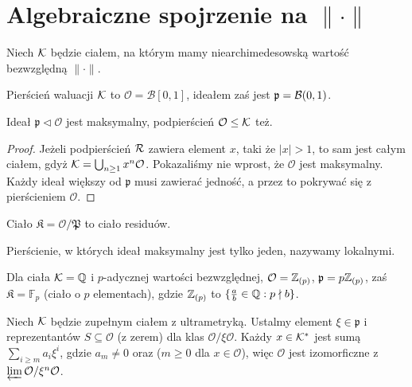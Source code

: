 \section{Algebraiczne spojrzenie na $\|\cdot\|$}
Niech $\mathcal K$ będzie ciałem, na którym mamy niearchimedesowską wartość bezwzględną $\|\cdot\|$.

\begin{definicja}
	Pierścień waluacji $\mathcal K$ to $\mathcal O = \mathcal B[0,1]$, ideałem zaś jest $\mathfrak p = \mathcal B(0, 1)$.
\end{definicja}

\begin{fakt}
	Ideał  $\mathfrak p \triangleleft \mathcal O$ jest maksymalny, podpierścień $\mathcal O \le \mathcal K$ też.
\end{fakt}

\begin{proof}
	Jeżeli podpierścień $\mathcal R$ zawiera element $x$, taki że $|x| > 1$, to sam jest całym ciałem, gdyż $\mathcal K = \bigcup_{n \ge 1} x^n \mathcal O$.
	Pokazaliśmy nie wprost, że $\mathcal O$ jest maksymalny.
	Każdy ideał większy od $\mathfrak p$ musi zawierać jedność, a przez to pokrywać się z pierścieniem $\mathcal O$.
\end{proof}

\begin{definicja}
	Ciało $\mathfrak K = \mathcal O / \mathfrak P$ to ciało residuów.
\end{definicja}

Pierścienie, w których ideał maksymalny jest tylko jeden, nazywamy lokalnymi.

\begin{fakt}
	Dla ciała $\mathcal K = \mathbb Q$ i $p$-adycznej wartości bezwzględnej,
	$\mathcal O = \mathbb Z_{(p)}$,
	$\mathfrak p = p \mathbb Z_{(p)}$, zaś
	$\mathfrak K = \mathbb F_p$ (ciało o $p$ elementach), gdzie $\mathbb Z_{(p)}$ to $\{\frac a b \in \mathbb Q : p \nmid b\}$.
\end{fakt}

\begin{fakt} \label{libresoy}
	Niech $\mathcal K$ będzie zupełnym ciałem z ultrametryką.
	Ustalmy element $\xi \in \mathfrak p$ i reprezentantów $S \subseteq \mathcal O$ (z zerem) dla klas $\mathcal O / \xi \mathcal O$.
	Każdy $x \in \mathcal K^*$ jest sumą $\sum_{i \ge m} a_i \xi^i$, gdzie $a_m \neq 0$ oraz ($m \ge 0$ dla $x \in \mathcal O$), więc $\mathcal O$ jest izomorficzne z $\varprojlim \mathcal O / \xi^n \mathcal O$.
\end{fakt}

